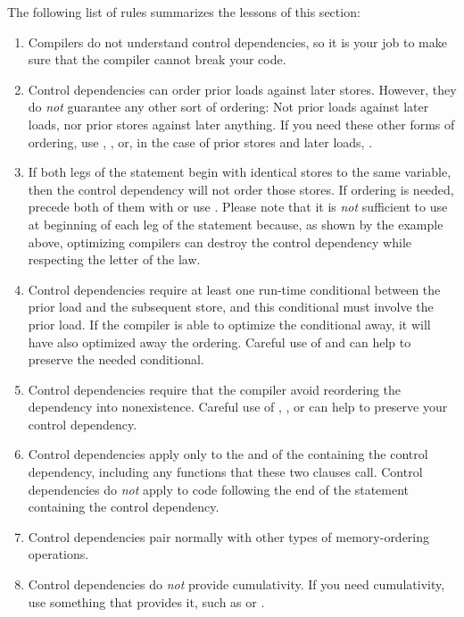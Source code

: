 The following list of rules summarizes the lessons of this section:

\begin{enumerate}
\item	Compilers do not understand control dependencies, so it is
	your job to make sure that the compiler cannot break your code.

\item	Control dependencies can order prior loads against later stores.
	However, they do \emph{not} guarantee any other sort of ordering:
	Not prior loads against later loads, nor prior stores against
	later anything.
	If you need these other forms of ordering, use ,
	, or, in the case of prior stores and later loads,
	.

\item	If both legs of the  statement begin with identical stores
	to the same variable, then the control dependency will not order
	those stores.
	If ordering is needed, precede both of them with  or
	use .
	Please note that it is \emph{not} sufficient to use 
	at beginning of each leg of the  statement because, as shown
	by the example above, optimizing compilers can destroy the control
	dependency while respecting the letter of the  law.

\item	Control dependencies require at least one run-time conditional
	between the prior load and the subsequent store, and this
	conditional must involve the prior load.
	If the compiler is able to optimize the conditional away, it
	will have also optimized away the ordering.
	Careful use of  and  can help
	to preserve the needed conditional.

\item	Control dependencies require that the compiler avoid reordering
	the dependency into nonexistence.
	Careful use of , , or
	 can help to preserve your control
	dependency.

\item	Control dependencies apply only to the  and
	 of the  containing the control
	dependency, including any functions that these two clauses call.
	Control dependencies do \emph{not} apply to code following the
	end of the  statement containing the control dependency.

\item	Control dependencies pair normally with other types of
	memory-ordering operations.

\item	Control dependencies do \emph{not} provide cumulativity.
	If you need cumulativity, use something that provides it,
	such as  or .
\end{enumerate}

